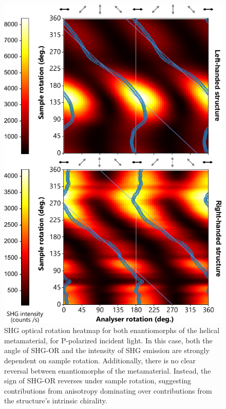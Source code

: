 \begin{figure}[htb!]	
    \centering	
    \includegraphics[scale=1]{./figures/results/OAinPlanarNanohelices/p_data.pdf}

    \caption{\label{fig:results:OAinPlanarNanohelices:p_data}
    SHG optical rotation heatmap for both enantiomorphs of the helical metamaterial, for P-polarized incident light. In this case, both the angle of SHG-OR and the intensity of SHG emission are strongly dependent on sample rotation. Additionally, there is no clear reversal between enantiomorphs of the metamaterial. Instead, the sign of SHG-OR reverses under sample rotation, suggesting contributions from anisotropy dominating over contributions from the structure’s intrinsic chirality.}	
\end{figure}

